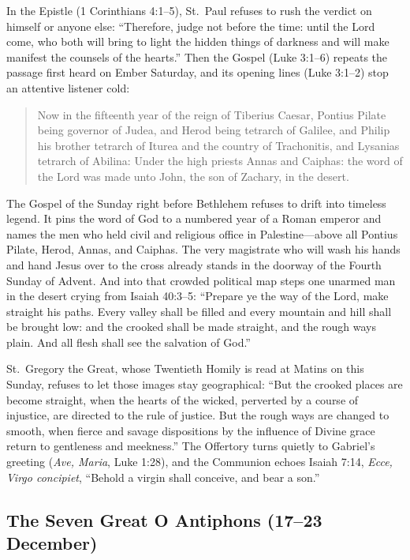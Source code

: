 In the Epistle (1 Corinthians 4:1--5), St.~Paul refuses to rush the verdict on
himself or anyone else: ``Therefore, judge not before the time: until the Lord
come, who both will bring to light the hidden things of darkness and will make
manifest the counsels of the hearts.'' Then the Gospel (Luke 3:1--6) repeats
the passage first heard on Ember Saturday, and its opening lines (Luke 3:1--2)
stop an attentive listener cold:

\begin{quote}
Now in the fifteenth year of the reign of Tiberius Caesar, Pontius Pilate being
governor of Judea, and Herod being tetrarch of Galilee, and Philip his brother
tetrarch of Iturea and the country of Trachonitis, and Lysanias tetrarch of
Abilina: Under the high priests Annas and Caiphas: the word of the Lord was
made unto John, the son of Zachary, in the desert.
\end{quote}

The Gospel of the Sunday right before Bethlehem refuses to drift into timeless
legend. It pins the word of God to a numbered year of a Roman emperor and names
the men who held civil and religious office in Palestine---above all Pontius
Pilate, Herod, Annas, and Caiphas. The very magistrate who will wash his hands
and hand Jesus over to the cross already stands in the doorway of the Fourth
Sunday of Advent. And into that crowded political map steps one unarmed man in
the desert crying from Isaiah 40:3--5: ``Prepare ye the way of the Lord, make
straight his paths. Every valley shall be filled and every mountain and hill
shall be brought low: and the crooked shall be made straight, and the rough
ways plain. And all flesh shall see the salvation of God.''

St.~Gregory the Great, whose Twentieth Homily is read at Matins on this Sunday,
refuses to let those images stay geographical: ``But the crooked places are
become straight, when the hearts of the wicked, perverted by a course of
injustice, are directed to the rule of justice. But the rough ways are changed
to smooth, when fierce and savage dispositions by the influence of Divine grace
return to gentleness and meekness.'' The Offertory turns quietly to Gabriel's
greeting (\textit{Ave, Maria}, Luke 1:28), and the Communion echoes Isaiah
7:14, \textit{Ecce, Virgo concipiet}, ``Behold a virgin shall conceive, and
bear a son.''

\subsection{The Seven Great O Antiphons (17--23 December)}

